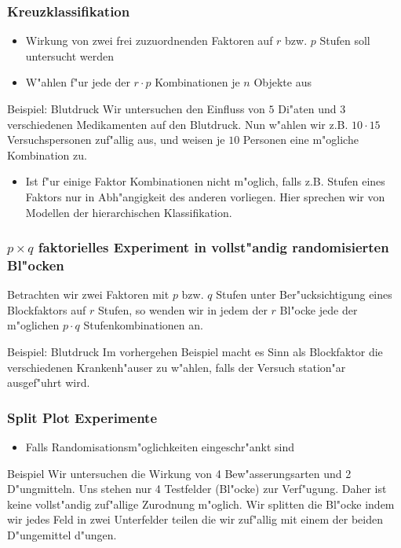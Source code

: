 \documentclass{beamer}
\begin{document}
\begin{frame}
  \frametitle{Kreuzklassifikation}
  \begin{itemize}[<+->]
    \item Wirkung von zwei frei zuzuordnenden Faktoren auf $r$ bzw. $p$ Stufen soll untersucht werden
    \item W"ahlen f"ur jede der $r\cdot p$ Kombinationen je $n$ Objekte aus
  \end{itemize}
  \pause
  \begin{exampleblock}{Beispiel: Blutdruck}
    Wir untersuchen den Einfluss von $5$ Di"aten und $3$ verschiedenen Medikamenten auf den Blutdruck. Nun w"ahlen wir z.B. $10\cdot 15$ Versuchspersonen zuf"allig aus, und weisen je $10$ Personen eine m"ogliche Kombination zu.
  \end{exampleblock}
  \pause
  \begin{itemize}[<+->]
    \item Ist f"ur einige Faktor Kombinationen nicht m"oglich, falls z.B. Stufen eines Faktors nur in Abh"angigkeit des anderen vorliegen. Hier sprechen wir von Modellen der hierarchischen Klassifikation.

  \end{itemize}
  \pause
\end{frame}

\begin{frame}
  \frametitle{$p\times q$ faktorielles Experiment in vollst"andig randomisierten Bl"ocken}
  Betrachten wir zwei Faktoren mit $p$ bzw. $q$ Stufen unter Ber"ucksichtigung eines Blockfaktors auf $r$ Stufen, so wenden wir in jedem der $r$ Bl"ocke jede der m"oglichen $p\cdot q$ Stufenkombinationen an. 

  \pause
  \begin{exampleblock}{Beispiel: Blutdruck}
    Im vorhergehen Beispiel macht es Sinn als Blockfaktor die verschiedenen Krankenh"auser zu w"ahlen, falls der Versuch station"ar ausgef"uhrt wird.
  \end{exampleblock}
\end{frame}

\begin{frame}
  \frametitle{Split Plot Experimente}
  \begin{itemize}[<+->]
    \item Falls Randomisationsm"oglichkeiten eingeschr"ankt sind
  \end{itemize}
  \pause
  \begin{exampleblock}{Beispiel}
    Wir untersuchen die Wirkung von 4 Bew"asserungsarten und 2 D"ungmitteln. Uns stehen nur 4 Testfelder (Bl"ocke) zur Verf"ugung. Daher ist keine vollst"andig zuf"allige Zurodnung m"oglich. Wir  splitten die Bl"ocke indem wir jedes Feld in zwei Unterfelder teilen die wir zuf"allig mit einem der beiden D"ungemittel d"ungen.    
  \end{exampleblock}
\end{frame}
\end{document}
